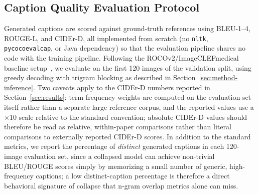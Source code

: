 \documentclass[conference]{IEEEtran}
\begin{document}
\subsection{Caption Quality Evaluation Protocol}
\label{sec:experiments-eval}
Generated captions are scored against ground-truth references using BLEU-1--4, ROUGE-L, and CIDEr-D, all implemented from scratch (no \texttt{nltk}, \texttt{pycocoevalcap}, or Java dependency) so that the evaluation pipeline shares no code with the training pipeline. Following the ROCOv2/ImageCLEFmedical baseline setup~\cite{ruckert2023imageclef}, we evaluate on the first 120 images of the validation split, using greedy decoding with trigram blocking as described in Section~\ref{sec:method-inference}. Two caveats apply to the CIDEr-D numbers reported in Section~\ref{sec:results}: term-frequency weights are computed on the evaluation set itself rather than a separate large reference corpus, and the reported values use a $\times10$ scale relative to the standard convention; absolute CIDEr-D values should therefore be read as relative, within-paper comparisons rather than literal comparisons to externally reported CIDEr-D scores. In addition to the standard metrics, we report the percentage of \emph{distinct} generated captions in each 120-image evaluation set, since a collapsed model can achieve non-trivial BLEU/ROUGE scores simply by memorizing a small number of generic, high-frequency captions; a low distinct-caption percentage is therefore a direct behavioral signature of collapse that n-gram overlap metrics alone can miss.
\end{document}

